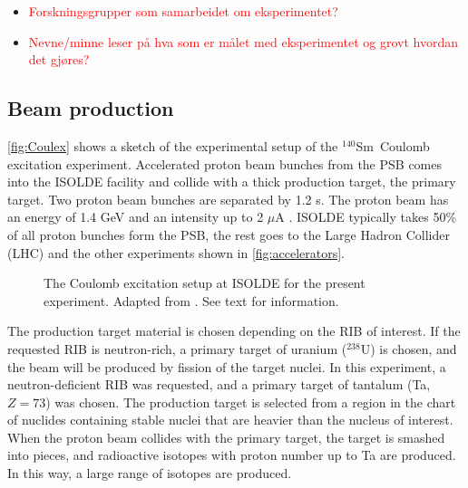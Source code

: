 \documentclass[twoside,english]{uiofysmaster/uiofysmaster}
\newcommand{\Sm}{$^{140}$Sm} %
\let\orgautoref\autoref
\renewcommand{\autoref}
        {%
		 \def\sectionautorefname{Section}%
		 \def\subsectionautorefname{Section}%
		 \def\subsubsectionautorefname{Section}%
		 \def\chapterautorefname{Chapter}%
          \orgautoref}
\begin{document}

\begin{itemize}
	\item \textcolor{red}{Forskningsgrupper som samarbeidet om eksperimentet?}
	\item \textcolor{red}{Nevne/minne leser på hva som er målet med eksperimentet og grovt hvordan det gjøres?}
\end{itemize}


\subsection{Beam production}\label{ssec:beam_prod}
\autoref{fig:Coulex} shows a sketch of the experimental setup of the \Sm\ Coulomb excitation experiment. 
Accelerated proton beam bunches from the PSB comes into the ISOLDE facility and collide with a thick production target, the primary target. 
Two proton beam bunches are separated by 1.2 s.
The proton beam has an energy of 1.4 GeV and an intensity up to 2 $\mu$A \cite{TIF, TIF2013}. 
ISOLDE typically takes 50\% \cite{MB-spect} of all proton bunches form the PSB, the rest goes to the Large Hadron Collider (LHC) and the other experiments shown in \autoref{fig:accelerators}. 

\begin{figure}[ht]
	\centering
	
	\caption{The Coulomb excitation setup at ISOLDE for the present experiment. Adapted from \cite{Klintefjord}. See text for information.}
	\label{fig:Coulex}
\end{figure}

The production target material is chosen depending on the RIB of interest. 
If the requested RIB is neutron-rich, a primary target of uranium ($^{238}$U) is chosen, and the beam will be produced by fission of the target nuclei.
In this experiment, a neutron-deficient RIB was requested, and a primary target of tantalum (Ta, $Z = 73$) was chosen.
The production target is selected from a region in the chart of nuclides containing stable nuclei that are heavier than the nucleus of interest.
When the proton beam collides with the primary target, the target is smashed into pieces, and radioactive isotopes with proton number up to Ta are produced.
In this way, a large range of isotopes are produced. 
\end{document}
